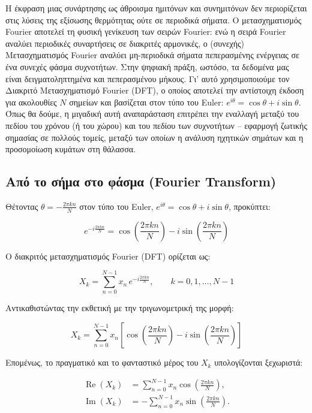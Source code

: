 \documentclass[a4paper, 11pt]{article}
\begin{document}
Η έκφραση μιας συνάρτησης ως άθροισμα ημιτόνων και συνημιτόνων δεν
περιορίζεται στις λύσεις της εξίσωσης θερμότητας ούτε σε περιοδικά
σήματα. Ο μετασχηματισμός Fourier αποτελεί τη φυσική γενίκευση των
σειρών Fourier: ενώ η σειρά Fourier αναλύει περιοδικές συναρτήσεις σε
διακριτές αρμονικές, ο (συνεχής) Μετασχηματισμός Fourier αναλύει
μη-περιοδικά σήματα πεπερασμένης ενέργειας σε ένα συνεχές φάσμα
συχνοτήτων. Στην ψηφιακή πράξη, ωστόσο, τα δεδομένα μας είναι
δειγματοληπτημένα και πεπερασμένου μήκους. Γι' αυτό χρησιμοποιούμε τον
Διακριτό Μετασχηματισμό Fourier (DFT), ο οποίος αποτελεί την αντίστοιχη
έκδοση για ακολουθίες \(N\) σημείων και βασίζεται στον τύπο του Euler:
\(e^{i\theta} = \cos\theta + i\sin\theta\). Όπως θα δούμε, η μιγαδική
αυτή αναπαράσταση επιτρέπει την εναλλαγή μεταξύ του πεδίου του χρόνου (ή
του χώρου) και του πεδίου των συχνοτήτων -- εφαρμογή ζωτικής σημασίας σε
πολλούς τομείς, μεταξύ των οποίων η ανάλυση ηχητικών σημάτων και η
προσομοίωση κυμάτων στη θάλασσα.

\subsection{Από το σήμα στο φάσμα (Fourier
Transform)}\label{ux3b1ux3c0ux3cc-ux3c4ux3bf-ux3c3ux3aeux3bcux3b1-ux3c3ux3c4ux3bf-ux3c6ux3acux3c3ux3bcux3b1-fourier-transform}

Θέτοντας \(\theta = -\frac{2\pi kn}{N}\) στον τύπο του Euler,
\(e^{i\theta} = \cos\theta + i\sin\theta\), προκύπτει:

\[e^{-i\frac{2\pi kn}{N}} = \cos\!\left(\frac{2\pi kn}{N}\right) - i\sin\!\left(\frac{2\pi kn}{N}\right)\]

Ο διακριτός μετασχηματισμός Fourier (DFT) ορίζεται ως:

\[X_k = \sum_{n=0}^{N-1} x_n \, e^{-i\frac{2\pi kn}{N}}, \qquad k = 0,1,\dots,N-1\]

Αντικαθιστώντας την εκθετική με την τριγωνομετρική της μορφή:

\[X_k = \sum_{n=0}^{N-1} x_n \left[\cos\!\left(\frac{2\pi kn}{N}\right) - i\sin\!\left(\frac{2\pi kn}{N}\right)\right]\]

Επομένως, το πραγματικό και το φανταστικό μέρος του \(X_k\)
υπολογίζονται ξεχωριστά:

\[\begin{aligned}
\operatorname{Re}(X_k) &= \sum_{n=0}^{N-1} x_n \cos\!\left(\frac{2\pi kn}{N}\right), \\[4pt]
\operatorname{Im}(X_k) &= -\sum_{n=0}^{N-1} x_n \sin\!\left(\frac{2\pi kn}{N}\right).
\end{aligned}\]
\end{document}

